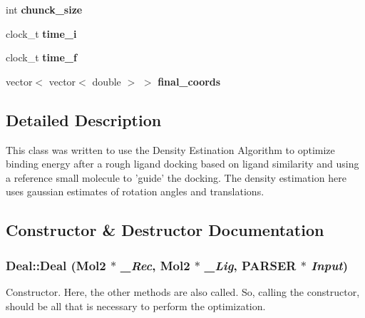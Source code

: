 \begin{DoxyCompactItemize}
\item 
\hypertarget{classDeal_afcc9298da87fc0bdd80a2cf8201d7089}{
int {\bfseries chunck\_\-size}}
\label{classDeal_afcc9298da87fc0bdd80a2cf8201d7089}

\item 
\hypertarget{classDeal_a0fa1dcafa8e1d88a5ac7cf88a27b2f87}{
clock\_\-t {\bfseries time\_\-i}}
\label{classDeal_a0fa1dcafa8e1d88a5ac7cf88a27b2f87}

\item 
\hypertarget{classDeal_a1469a187f67215e4e10a2f5f94c3b16d}{
clock\_\-t {\bfseries time\_\-f}}
\label{classDeal_a1469a187f67215e4e10a2f5f94c3b16d}

\item 
\hypertarget{classDeal_a7cb8a68a46ce64218c0328b808c10357}{
vector$<$ vector$<$ double $>$ $>$ {\bfseries final\_\-coords}}
\label{classDeal_a7cb8a68a46ce64218c0328b808c10357}

\end{DoxyCompactItemize}


\subsection{Detailed Description}
This class was written to use the Density Estination Algorithm to optimize binding energy after a rough ligand docking based on ligand similarity and using a reference small molecule to 'guide' the docking. The density estimation here uses gaussian estimates of rotation angles and translations. 

\subsection{Constructor \& Destructor Documentation}
\hypertarget{classDeal_acc21499a89384247e4fb15568cf17982}{
\subsubsection[{Deal}]{\setlength{\rightskip}{0pt plus 5cm}Deal::Deal ({\bf Mol2} $\ast$ {\em \_\-Rec}, \/  {\bf Mol2} $\ast$ {\em \_\-Lig}, \/  {\bf PARSER} $\ast$ {\em Input})}}
\label{classDeal_acc21499a89384247e4fb15568cf17982}
Constructor. Here, the other methods are also called. So, calling the constructor, should be all that is necessary to perform the optimization. 


